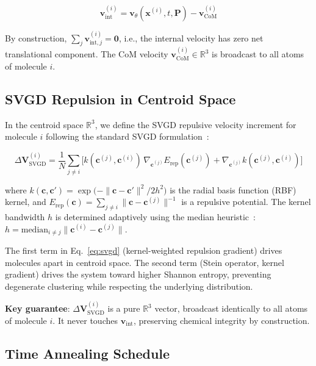 \documentclass[a4paper,11pt]{article}
\begin{document}
\begin{equation}
\mathbf{v}_{\text{int}}^{(i)} = \mathbf{v}_\theta(\mathbf{x}^{(i)}, t, \mathbf{P}) - \mathbf{v}_{\text{CoM}}^{(i)}
\label{eq:vint}
\end{equation}

By construction, $\sum_j \mathbf{v}_{\text{int}, j}^{(i)} = \mathbf{0}$, i.e.,
the internal velocity has zero net translational component.  The CoM velocity
$\mathbf{v}_{\text{CoM}}^{(i)} \in \mathbb{R}^3$ is broadcast to all atoms of
molecule $i$.

\subsection{SVGD Repulsion in Centroid Space}

In the centroid space $\mathbb{R}^3$, we define the SVGD repulsive velocity
increment for molecule $i$ following the standard SVGD
formulation~\cite{liu2016svgd}:

\begin{equation}
\Delta \mathbf{V}_{\text{SVGD}}^{(i)} = \frac{1}{N} \sum_{j \neq i} \Big[
  k(\mathbf{c}^{(j)}, \mathbf{c}^{(i)}) \, \nabla_{\mathbf{c}^{(j)}} E_{\text{rep}}(\mathbf{c}^{(j)}) +
  \nabla_{\mathbf{c}^{(j)}} k(\mathbf{c}^{(j)}, \mathbf{c}^{(i)})
\Big]
\label{eq:svgd}
\end{equation}

where $k(\mathbf{c}, \mathbf{c}') = \exp\bigl(-\|\mathbf{c} -
\mathbf{c}'\|^2 / 2h^2\bigr)$ is the radial basis function (RBF) kernel, and
$E_{\text{rep}}(\mathbf{c}) = \sum_{j \neq i} \|\mathbf{c} -
\mathbf{c}^{(j)}\|^{-1}$ is a repulsive potential.  The kernel bandwidth $h$ is
determined adaptively using the median heuristic~\cite{liu2016svgd}:
$h = \text{median}_{i \neq j} \|\mathbf{c}^{(i)} - \mathbf{c}^{(j)}\|$.

The first term in Eq.~\ref{eq:svgd} (kernel-weighted repulsion gradient) drives
molecules apart in centroid space.  The second term (Stein operator, kernel
gradient) drives the system toward higher Shannon entropy, preventing degenerate
clustering while respecting the underlying distribution.

\textbf{Key guarantee}: $\Delta \mathbf{V}_{\text{SVGD}}^{(i)}$ is a pure
$\mathbb{R}^3$ vector, broadcast identically to all atoms of molecule $i$.  It
never touches $\mathbf{v}_{\text{int}}$, preserving chemical integrity by
construction.

\subsection{Time Annealing Schedule}
\end{document}
